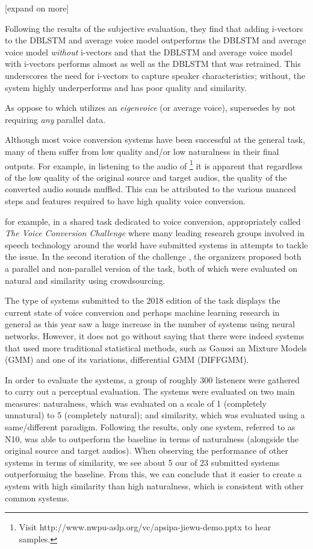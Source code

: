 \documentclass
[
    a4paper,
    twoside,
    12pt
]
{report}
\begin{document}
{[}expand on \textcite{wu2016} more{]}

Following the results of the subjective evaluation, they find that
adding i-vectors to the DBLSTM and average voice model outperforms the
DBLSTM and average voice model \emph{without} i-vectors and that the
DBLSTM and average voice model with i-vectors performs almost as well as
the DBLSTM that was retrained. This underscores the need for i-vectors
to capture speaker characteristics; without, the system highly
underperforms and has poor quality and similarity.

As oppose to \textcite{wu2016} which utilizes an \emph{eigenvoice} (or
average voice), \textcite{kinnunen2017} supersedes \textcite{wu2016} by
not requiring \emph{any} parallel data.

Although most voice conversion systems have been successful at the
general task, many of them suffer from low quality and/or low
naturalness in their final outputs. For example, in listening to the
audio of
\textcite{wu2016}\footnote{Visit http://www.nwpu-aslp.org/vc/apsipa-jiewu-demo.pptx to hear samples.}
it is apparent that regardless of the low quality of the original source
and target audios, the quality of the converted audio sounds muffled.
This can be attributed to the various nuanced steps and features
required to have high quality voice conversion.

for example, in a shared task dedicated to voice conversion,
appropriately called \emph{The Voice Conversion Challenge} where many
leading research groups involved in speech technology around the world
have submitted systems in attempts to tackle the issue. In the second
iteration of the challenge \textcite{lorenzo-trueba2018}, the organizers
proposed both a parallel and non-parallel version of the task, both of
which were evaluated on natural and similarity using crowdsourcing.

The type of systems submitted to the 2018 edition of the task displays
the current state of voice conversion and perhaps machine learning
research in general as this year saw a huge increase in the number of
systems using neural networks. However, it does not go without saying
that there were indeed systems that used more traditional statistical
methods, such as Gaussi an Mixture Models (GMM) and one of its
variations, differential GMM (DIFFGMM).

In order to evaluate the systems, a group of roughly 300 listeners were
gathered to carry out a perceptual evaluation. The systems were
evaluated on two main measures: naturalness, which was evaluated on a
scale of 1 (completely unnatural) to 5 (completely natural); and
similarity, which was evaluated using a same/different paradigm.
Following the results, only one system, referred to as N10, was able to
outperform the baseline in terms of naturalness (alongside the original
source and target audios). When observing the performance of other
systems in terms of similarity, we see about 5 our of 23 submitted
systems outperforming the baseline. From this, we can conclude that it
easier to create a system with high similarity than high naturalness,
which is consistent with other common systems.
\end{document}

